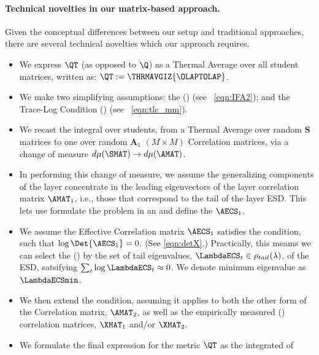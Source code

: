 \paragraph{Technical novelties in our matrix-based \SETOL approach.}
Given the conceptual differences between our \SETOL setup and traditional \STATMECH approaches, there are several technical novelties which our approach requires.
\begin{itemize}
\item  We express $\QT$ (as opposed to $\Q$) as a Thermal Average over all student matrices, written as:  $\QT:=\THRMAVGIZ{\OLAPTOLAP}$.
\item  We make two simplifying assumptions:
       the \emph{\IndependentFluctuationApproximation} (\IFA) (see \EQN~\ref{eqn:IFA2}); and 
       the Trace-Log Condition (\TRACELOG) (see \EQN~\ref{eqn:tlc_mm}).
\item  We recast the integral over students, from a Thermal Average over random 
       $\mathbf{S}$ matrices %
       to one over random 
       $\mathbf{A}_1$ $(M \times M)$ Correlation matrices, via a change of measure $d\mu(\SMAT)\rightarrow d\mu(\AMAT)$.  
\item  In performing this change of measure, 
       we assume the generalizing components of the layer concentrate in the leading eigenvectors of the layer correlation matrix $\AMAT_1$, 
       i.e., those that correspond to the tail of the layer ESD. 
       This lets use formulate the problem in an \EffectiveCorrelationSpace and define the \emph{\EffectiveCorrelationMatrix} $\AECS_1$.
\item  We assume the Effective Correlation matrix $\AECS_1$ satisfies the \TRACELOG condition, 
       such that $\log\Det{\AECS_{1}}=0$. 
       (See \EQN \ref{eqn:detX}.) 
       Practically, this meams we can select the \EffectiveCorrelationSpace (\ECS) by the set of tail eigenvalues,
       $\LambdaECS_{t}\in\rho_{tail}(\lambda)$, of the \Teacher ESD, satsifying $\sum_{t}\log\LambdaECS_{t}\approx 0$.
       We denote  \ECS minimum eigenvalue as $\LambdaECSmin$.
\item  We then extend the \TRACELOG condition, 
       assuming it applies to both the other form of the \Student Correlation matrix, $\AMAT_2$, 
       as well as the empirically measured (\Teacher) correlation matrices, $\XMAT_1$ and/or $\XMAT_2$.
\item  We formulate the final expression for the \LayerQuality metric $\QT$ as the integrated \RTransform of 

\end{itemize}
